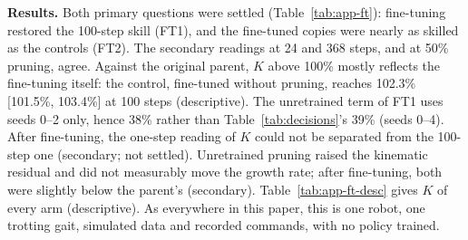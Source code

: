 \textbf{Results.} Both primary questions were settled (Table~\ref{tab:app-ft}): fine-tuning restored the 100-step
skill (FT1), and the fine-tuned copies were nearly as skilled as the controls (FT2). The secondary readings at 24 and
368 steps, and at 50\% pruning, agree. Against the original parent, $K$ above 100\% mostly reflects the fine-tuning
itself: the control, fine-tuned without pruning, reaches 102.3\% [101.5\%, 103.4\%] at 100
steps (descriptive). The unretrained term of FT1 uses seeds 0--2 only, hence 38\% rather than
Table~\ref{tab:decisions}'s 39\% (seeds 0--4). After fine-tuning, the one-step reading of $K$ could not be
separated from the 100-step one (secondary; not settled). Unretrained pruning raised the kinematic residual and did
not measurably move the growth rate; after fine-tuning, both were slightly below the parent's (secondary). Table~\ref{tab:app-ft-desc} gives $K$ of every arm (descriptive). As everywhere in this paper, this is
one robot, one trotting gait, simulated data and recorded commands, with no policy trained.

